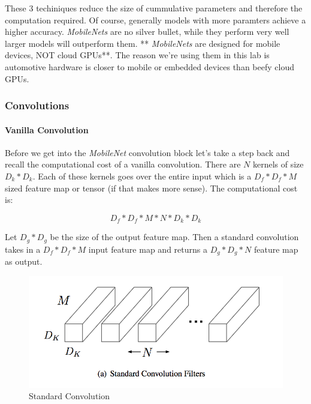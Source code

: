 \documentclass[11pt]{article}
\makeatletter
\def\maxwidth{\ifdim\Gin@nat@width>\linewidth\linewidth
    \else\Gin@nat@width\fi}
\let\Oldincludegraphics\includegraphics
\renewcommand{\includegraphics}[1]{\Oldincludegraphics[width=.8\maxwidth]{#1}}
\makeatother
\begin{document}
These 3 techiniques reduce the size of cummulative parameters and
therefore the computation required. Of course, generally models with
more paramters achieve a higher accuracy. \emph{MobileNets} are no
silver bullet, while they perform very well larger models will
outperform them. ** \emph{MobileNets} are designed for mobile devices,
NOT cloud GPUs**. The reason we're using them in this lab is automotive
hardware is closer to mobile or embedded devices than beefy cloud GPUs.

    \hypertarget{convolutions}{%
\subsubsection{Convolutions}\label{convolutions}}

\hypertarget{vanilla-convolution}{%
\paragraph{Vanilla Convolution}\label{vanilla-convolution}}

Before we get into the \emph{MobileNet} convolution block let's take a
step back and recall the computational cost of a vanilla convolution.
There are \(N\) kernels of size \(D_k * D_k\). Each of these kernels
goes over the entire input which is a \(D_f * D_f * M\) sized feature
map or tensor (if that makes more sense). The computational cost is:

\[
D_f * D_f * M * N * D_k * D_k
\]

Let \(D_g * D_g\) be the size of the output feature map. Then a standard
convolution takes in a \(D_f * D_f * M\) input feature map and returns a
\(D_g * D_g * N\) feature map as output.

\begin{figure}
\centering
\includegraphics{assets/standard_conv.png}
\caption{Standard Convolution}
\end{figure}
\end{document}
